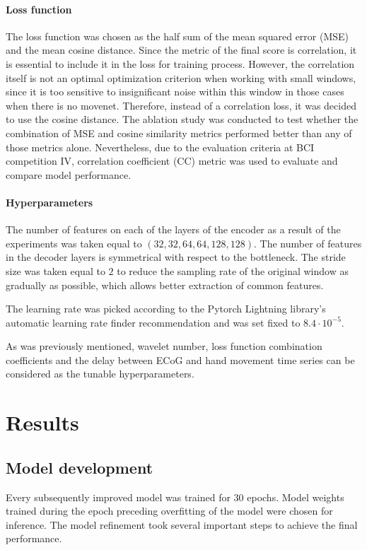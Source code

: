\documentclass[letterpaper]{article} \usepackage{aaai22}  \usepackage{times}  \usepackage{helvet}  \usepackage{courier}  \usepackage[hyphens]{url}  \usepackage{graphicx} \urlstyle{rm} \def\UrlFont{\rm}  \usepackage{natbib}  \usepackage{caption} \DeclareCaptionStyle{ruled}{labelfont=normalfont,labelsep=colon,strut=off} \frenchspacing  \setlength{\pdfpagewidth}{8.5in}  \setlength{\pdfpageheight}{11in}  \usepackage{algorithm}
\begin{document}
\paragraph{Loss function}

The loss function was chosen as the half sum of the mean squared error (MSE) and the mean cosine distance. Since the metric of the final score is correlation, it is essential to include it in the loss for training process. However, the correlation itself is not an optimal optimization criterion when working with small windows, since it is too sensitive to insignificant noise within this window in those cases when there is no movenet. Therefore, instead of a correlation loss, it was decided to use the cosine distance. The ablation study was conducted to test whether the combination of MSE and cosine similarity metrics performed better than any of those metrics alone. 
Nevertheless, due to the evaluation criteria at BCI competition IV, correlation coefficient (CC) metric was used to evaluate and compare model performance.

\paragraph{Hyperparameters}

The number of features on each of the layers of the encoder as a result of the experiments was taken equal to $(32, 32, 64, 64, 128, 128)$. The number of features in the decoder layers is symmetrical with respect to the bottleneck. The stride size was taken equal to $2$ to reduce the sampling rate of the original window as gradually as possible, which allows better extraction of common features.

The learning rate was picked according to the Pytorch Lightning library's automatic learning rate finder recommendation and was set fixed to $8.4 \cdot 10^{-5}$.

As was previously mentioned, wavelet number, loss function combination coefficients and the delay between ECoG and hand movement time series can be considered as the tunable hyperparameters.


\section{Results}


\subsection{Model development}
Every subsequently improved model was trained for $30$ epochs. Model weights trained during the epoch preceding overfitting of the model were chosen for inference. The model refinement took several important steps to achieve the final performance.
\end{document}
